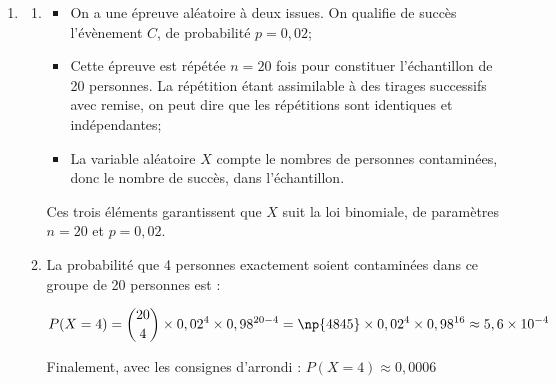 \begin{enumerate}
\begin{enumerate}
Il y a $\dfrac{90,57}{9,43}\approx 9,6$ fois plus de personnes vaccinées que non vaccinées parmi les personnes non contaminées.

		\item \og Plus de 98~\% de la population vaccinée n'a pas été contaminée.\fg{}

Cette affirmation est \textbf{vraie}, car on a calculé qu'environ 1,38~\% des personnes vaccinées ont été contaminées par le virus, donc, par complémentaire, cela implique qu'environ 98,62~\% des personnes vaccinées n'ont pas été contaminées. Il est donc correct de dire que c'est plus de 98~\%.
	\end{enumerate}
\item
	\begin{enumerate}
		\item 
\begin{itemize}
\item On a une épreuve aléatoire à deux issues. On qualifie de succès l'évènement $C$, de probabilité $p = 0,02$;
\item Cette épreuve est répétée $n =20$ fois pour constituer l'échantillon de 20 personnes. La répétition étant assimilable à des tirages successifs avec remise, on peut dire que les répétitions sont identiques et indépendantes;
\item La variable aléatoire $X$ compte le nombres de personnes contaminées, donc le nombre de succès, dans l'échantillon.
\end{itemize}

Ces trois éléments garantissent que $X$ suit la loi binomiale, de paramètres $n = 20$ et $p = 0,02$.

		\item La probabilité que 4 personnes exactement soient contaminées dans ce groupe de 20 personnes est :

			$P(X = 4) = \displaystyle \binom{20}{4}\times 0,02^4 \times 0,98^{20 - 4} = \np{4845}\times 0,02^4 \times 0,98^{16} \approx 5,6\times 10^{-4}$

Finalement, avec les consignes d'arrondi : \quad $P(X = 4) \approx 0,0006$
	\end{enumerate}
\end{enumerate}

\medskip

